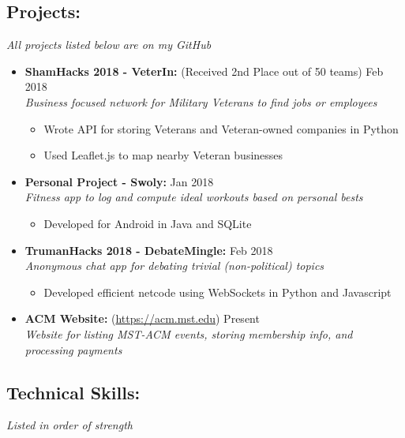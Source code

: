 \documentclass[9pt,oneside]{memoir}
\begin{document}
\subsection*{Projects:}
\vspace*{-4px}
\textit{All projects listed below are on my GitHub}
\begin{itemize}

  \item[] \textbf{ShamHacks 2018 - VeterIn:} (Received 2nd Place out of 50 teams)
    \hfill Feb 2018\\
    \textit{Business focused network for Military Veterans to find jobs or employees}
    \begin{itemize}
      \item[\textbullet] Wrote API for storing Veterans and Veteran-owned companies in Python
      \item[\textbullet] Used Leaflet.js to map nearby Veteran businesses
    \end{itemize}
      
  \item[] \textbf{Personal Project - Swoly:}
    \hfill Jan 2018\\
    \textit{Fitness app to log and compute ideal workouts based on personal bests}
    \begin{itemize}
      \item[\textbullet] Developed for Android in Java and SQLite
    \end{itemize}
    
  \item[] \textbf{TrumanHacks 2018 - DebateMingle:}
    \hfill Feb 2018\\
    \textit{Anonymous chat app for debating trivial (non-political) topics}
    \begin{itemize}
      \item[\textbullet] Developed efficient netcode using WebSockets in Python and Javascript
    \end{itemize}

    \item[] \textbf{ACM Website:} (\url{https://acm.mst.edu})
    \hfill Present\\
    \textit{Website for listing MST-ACM events, storing membership info, and processing payments}
  \end{itemize}

\subsection*{Technical Skills:}
\vspace*{-4px}
\textit{Listed in order of strength}
\vspace*{4px}
\end{document}
